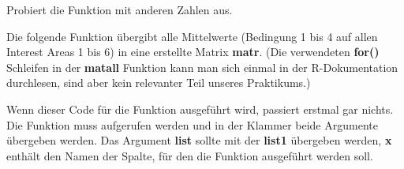 \documentclass[]{book}
\newenvironment{Shaded}{\begin{snugshade}}{\end{snugshade}}
\newcommand{\KeywordTok}[1]{\textcolor[rgb]{0.13,0.29,0.53}{\textbf{#1}}}
\newcommand{\DataTypeTok}[1]{\textcolor[rgb]{0.13,0.29,0.53}{#1}}
\newcommand{\DecValTok}[1]{\textcolor[rgb]{0.00,0.00,0.81}{#1}}
\newcommand{\StringTok}[1]{\textcolor[rgb]{0.31,0.60,0.02}{#1}}
\newcommand{\CommentTok}[1]{\textcolor[rgb]{0.56,0.35,0.01}{\textit{#1}}}
\newcommand{\ControlFlowTok}[1]{\textcolor[rgb]{0.13,0.29,0.53}{\textbf{#1}}}
\newcommand{\OperatorTok}[1]{\textcolor[rgb]{0.81,0.36,0.00}{\textbf{#1}}}
\newcommand{\NormalTok}[1]{#1}
\begin{document}
Probiert die Funktion mit anderen Zahlen aus.

Die folgende Funktion übergibt alle Mittelwerte (Bedingung 1 bis 4 auf
allen Interest Areas 1 bis 6) in eine erstellte Matrix \textbf{matr}.
(Die verwendeten \textbf{for()} Schleifen in der \textbf{matall}
Funktion kann man sich einmal in der R-Dokumentation durchlesen, sind
aber kein relevanter Teil unseres Praktikums.)

\begin{Shaded}
\end{Shaded}

Wenn dieser Code für die Funktion ausgeführt wird, passiert erstmal gar
nichts. Die Funktion muss aufgerufen werden und in der Klammer beide
Argumente übergeben werden. Das Argument \textbf{list} sollte mit der
\textbf{list1} übergeben werden, \textbf{x} enthält den Namen der
Spalte, für den die Funktion ausgeführt werden soll.
\end{document}
